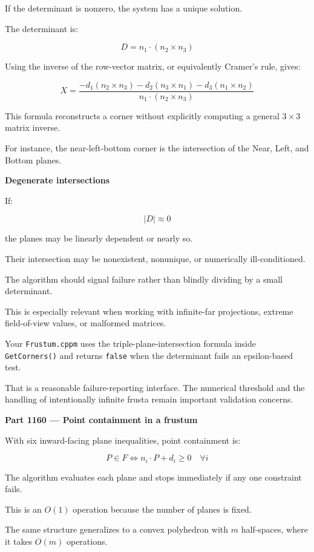 If the determinant is nonzero, the system has a unique solution.

The determinant is:

\[
D=n_1\cdot(n_2\times n_3)
\]

Using the inverse of the row-vector matrix, or equivalently Cramer's rule, gives:

\[
\boxed{ X= \frac{ -d_1(n_2\times n_3) -d_2(n_3\times n_1) -d_3(n_1\times n_2) }{ n_1\cdot(n_2\times n_3) } }
\]

This formula reconstructs a corner without explicitly computing a general \(3\times3\) matrix inverse.

For instance, the near-left-bottom corner is the intersection of the Near, Left, and Bottom planes.

\textbf{Degenerate intersections}

If:

\[
|D|\approx0
\]

the planes may be linearly dependent or nearly so.

Their intersection may be nonexistent, nonunique, or numerically ill-conditioned.

The algorithm should signal failure rather than blindly dividing by a small determinant.

This is especially relevant when working with infinite-far projections, extreme field-of-view values, or malformed matrices.

Your \texttt{Frustum.cppm} uses the triple-plane-intersection formula inside \texttt{GetCorners()} and returns \texttt{false} when the determinant fails an epsilon-based test.

That is a reasonable failure-reporting interface. The numerical threshold and the handling of intentionally infinite frusta remain important validation concerns.

\textbf{Part 1160 --- Point containment in a frustum}

With six inward-facing plane inequalities, point containment is:

\[
\boxed{ P\in F \iff n_i\cdot P+d_i\ge0 \quad\forall i }
\]

The algorithm evaluates each plane and stops immediately if any one constraint fails.

This is an \(O(1)\) operation because the number of planes is fixed.

The same structure generalizes to a convex polyhedron with \(m\) half-spaces, where it takes \(O(m)\) operations.

